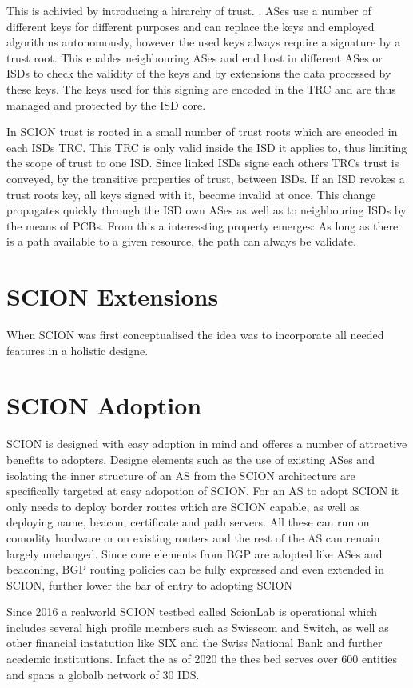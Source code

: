 \documentclass[../eva1_scion.tex]{subfiles}
\begin{document}
    This is achivied by introducing a hirarchy of trust. \cite{scion_2011}. ASes use a number of different keys for different purposes and can replace the keys and employed algorithms autonomously, however the used keys always require a signature by a trust root. This enables neighbouring ASes and end host in different ASes or ISDs to check the validity of the keys and by extensions the data processed by these keys. The keys used for this signing are encoded in the TRC and are thus managed and protected by the ISD core.

    In SCION trust is rooted in a small number of trust roots which are encoded in each ISDs TRC. This TRC is only valid inside the ISD it applies to, thus limiting the scope of trust to one ISD. Since linked ISDs signe each others TRCs trust is conveyed, by the transitive properties of trust, between ISDs. If an ISD revokes a trust roots key, all keys signed with it, become invalid at once. This change propagates quickly through the ISD own ASes as well as to neighbouring ISDs by the means of PCBs. From this a interessting property emerges: As long as there is a path available to a given resource, the path can always be validate.

    \section{SCION Extensions}
    When SCION was first conceptualised the idea was to incorporate all needed features in a holistic designe.

    \section{SCION Adoption}
    SCION is designed with easy adoption in mind and offeres a number of attractive benefits to adopters. Designe elements such as the use of existing ASes and isolating the inner structure of an AS from the SCION architecture are specifically targeted at easy adopotion of SCION. For an AS to adopt SCION it only needs to deploy border routes which are SCION capable, as well as deploying name, beacon, certificate and path servers. All these can run on comodity hardware or on existing routers and the rest of the AS can remain largely unchanged. Since core elements from BGP are adopted like ASes and beaconing, BGP routing policies can be fully expressed and even extended in SCION, further lower the bar of entry to adopting SCION \cite{scion_2017}

    Since 2016 a realworld SCION testbed called ScionLab is operational \cite{testbed_2020} which includes several high profile members such as Swisscom and Switch, as well as other financial instatution like SIX and the Swiss National Bank \cite{snb} and further acedemic institutions. Infact the as of 2020 the thes bed serves over 600 entities and spans a globalb network of 30 IDS.
\end{document}
